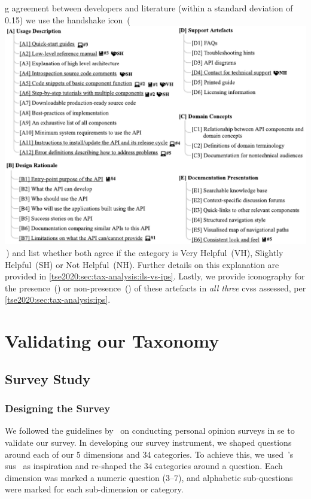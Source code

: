 g agreement between developers and literature (within a standard deviation of 0.15) we use the handshake icon~(\,\includegraphics{handshake}\,) and list whether both agree if the category is Very Helpful~(VH), Slightly Helpful~(SH) or Not Helpful~(NH). Further details on this explanation are provided in \cref{tse2020:sec:tax-analysis:ils-vs-ips}. Lastly, we provide iconography for the presence~(\faCheckCircle) or non-presence~(\faTimesCircle) of these   artefacts in \textit{all three} \glspl{cvs} assessed, per \cref{tse2020:sec:tax-analysis:ips}.


\section{Validating our Taxonomy}
\label{tse2020:sec:validation}

\subsection{Survey Study}
\label{tse2020:sec:validation:survey}

\subsubsection{Designing the Survey}

We followed the guidelines by~\citet{Kitchenham:2007ux} on conducting personal opinion surveys in \gls{se} to validate our survey. In developing our survey instrument, we  shaped questions around each of our 5 dimensions and 34 categories. To achieve this, we used~\citeauthor{Brooke:1996ua}'s \gls{sus}~\citep{Brooke:1996ua} as inspiration and re-shaped the 34 categories around a question. Each dimension was marked a numeric question (3--7), and alphabetic sub-questions were marked for each sub-dimension or category.

